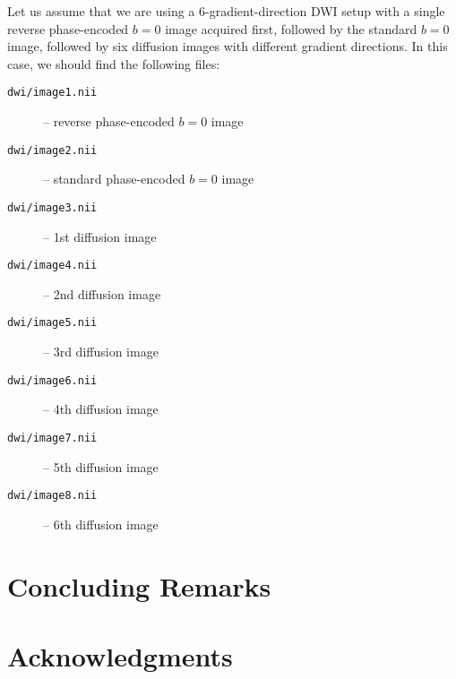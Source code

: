 \documentclass{InsightArticle}
\begin{document}
Let us assume that we are using a 6-gradient-direction DWI setup with a single
reverse phase-encoded $b=0$ image acquired first, followed by the standard
$b=0$ image, followed by six diffusion images with different gradient
directions. In this case, we should find the following files:
\begin{description}
\item[\tt dwi/image1.nii] -- reverse phase-encoded $b=0$ image
\item[\tt dwi/image2.nii] -- standard phase-encoded $b=0$ image
\item[\tt dwi/image3.nii] -- 1st diffusion image
\item[\tt dwi/image4.nii] -- 2nd diffusion image
\item[\tt dwi/image5.nii] -- 3rd diffusion image
\item[\tt dwi/image6.nii] -- 4th diffusion image
\item[\tt dwi/image7.nii] -- 5th diffusion image
\item[\tt dwi/image8.nii] -- 6th diffusion image
\end{description}

\section{Concluding Remarks}

\section*{Acknowledgments}



\end{document}
